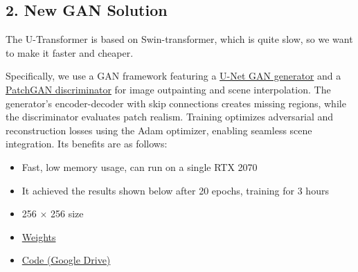 \documentclass[sigconf]{acmart}
\begin{document}
\subsection*{2. New GAN Solution}
The U-Transformer is based on Swin-transformer, which is quite slow, so we want to make it faster and cheaper.

Specifically, we use a GAN framework featuring a \textcolor{red}{\href{https://paperswithcode.com/method/u-net-gan}{U-Net GAN generator}} and a \textcolor{red}{\href{https://paperswithcode.com/method/patchgan}{PatchGAN discriminator}} for image outpainting and scene interpolation. The generator’s encoder-decoder with skip connections creates missing regions, while the discriminator evaluates patch realism. Training optimizes adversarial and reconstruction losses using the Adam optimizer, enabling seamless scene integration. Its benefits are as follows:
\begin{itemize}
    \item Fast, low memory usage, can run on a single RTX 2070
    \item It achieved the results shown below after 20 epochs, training for 3 hours
    \item 256 $\times$ 256 size
    \item \textcolor{red}{\href{https://drive.google.com/file/d/1EORJGbg-rMQ_FNpzz7OSG73Vluro0Lxl/view?usp=sharing}{Weights}}
    \item \textcolor{red}{\href{https://drive.google.com/drive/u/2/folders/1wOD_tgj9k3gUZI9hBL-WtKDS-uvz9m5S}{Code (Google Drive)}}
\end{itemize}
\end{document}
